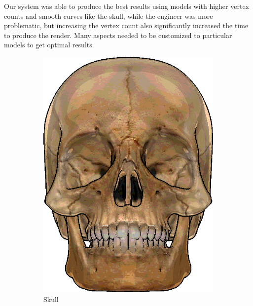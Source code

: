 
Our system was able to produce the best results using models with higher vertex counts and smooth curves like the 
skull, while the engineer was more problematic, but increasing the vertex count also significantly increased the 
time to produce the render. Many aspects needed to be customized to particular models to get optimal results.

\begin{figure}[h]
\centering
\begin{subfigure}[b]{0.2\textwidth}
        \includegraphics[width=\textwidth]{img/Combined/FinalSkull.png}
        \caption{Skull}
 		\label{fig:FinalSkull}
\end{subfigure}
~
\hspace{36pt}
~
\begin{subfigure}[b]{0.18\textwidth}

\end{subfigure}
\end{figure}
